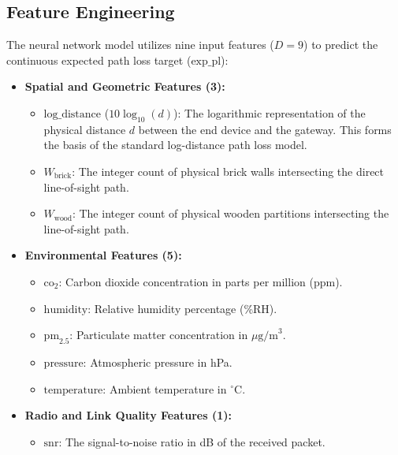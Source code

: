 \subsection{Feature Engineering}
The neural network model utilizes nine input features ($D=9$) to predict the continuous expected path loss target ($\text{exp\_pl}$):
\begin{itemize}
    \item \textbf{Spatial and Geometric Features (3):}
    \begin{itemize}
        \item $\text{log\_distance}$ ($10\log_{10}(d)$): The logarithmic representation of the physical distance $d$ between the end device and the gateway. This forms the basis of the standard log-distance path loss model.
        \item $W_{\text{brick}}$: The integer count of physical brick walls intersecting the direct line-of-sight path.
        \item $W_{\text{wood}}$: The integer count of physical wooden partitions intersecting the line-of-sight path.
    \end{itemize}
    \item \textbf{Environmental Features (5):}
    \begin{itemize}
        \item $\text{co}_2$: Carbon dioxide concentration in parts per million (ppm).
        \item $\text{humidity}$: Relative humidity percentage (\%RH).
        \item $\text{pm}_{2.5}$: Particulate matter concentration in $\mu\text{g/m}^3$.
        \item $\text{pressure}$: Atmospheric pressure in hPa.
        \item $\text{temperature}$: Ambient temperature in $^{\circ}$C.
    \end{itemize}
    \item \textbf{Radio and Link Quality Features (1):}
    \begin{itemize}
        \item $\text{snr}$: The signal-to-noise ratio in dB of the received packet.
    \end{itemize}
\end{itemize}

